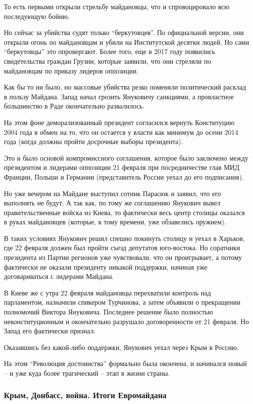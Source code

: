 То есть первыми открыли стрельбу майдановцы, что и спровоцировало всю
последующую бойню.

Но сейчас за убийства судят только \enquote{беркутовцев}. По официальной версии,
они открыли огонь по майдановцам и убили на Институтской десятки людей. Но
сами \enquote{беркутовцы} это опровергают. Более того, еще в 2017 году появились
свидетельства граждан Грузии, которые заявили, что они стреляли по
майдановцам по приказу лидеров оппозиции. 

Как бы то ни было, но массовые убийства резко поменяли политический
расклад в пользу Майдана. Запад начал грозить Януковичу санкциями, а
провластное большинство в Раде окончательно развалилось.

На этом фоне деморализованный президент согласился вернуть Конституцию
2004 года в обмен на то, что он остается у власти как минимум до осени
2014 года (когда должны пройти досрочные выборы президента).

Это и было основой компромиссного соглашения, которое было заключено между
президентом и лидерами оппозиции 21 февраля при посредничестве глав МИД
Франции, Польши и Германии (представитель России уехал до его подписания).

Но уже вечером на Майдане выступил сотник Парасюк и заявил, что его
выполнять не будут. А так как, по тому же соглашению Янукович вывел
правительственные войска из Киева, то фактически весь центр столицы
оказался в руках майдановцев (которые, к тому времени, уже обзавелись
оружием). 

В таких условиях Янукович решил спешно покинуть столицу и уехал в Харьков,
где 22 февраля должен был пройти съезд депутатов юго-востока. Но соратники
президента из Партии регионов уже чувствовали, что он проигрывает, а
потому фактически не оказали президенту никакой поддержки, начиная уже
договариваться с лидерами Майдана.

В Киеве же с утра 22 февраля майдановцы перехватили контроль над
парламентом, назначили спикером Турчинова, а затем объявили о прекращении
полномочий Виктора Януковича. Последнее решение было полностью
неконституционным и окончательно разрушало договоренности от 21 февраля.
Но Запад его фактически признал.

Оказавшись без какой-либо поддержки, Янукович уехал через Крым в Россию. 

На этом \enquote{Революция достоинства} формально была окончена, и начинался новый
– и уже куда более трагический – этап в жизни страны. 

\subsubsection{Крым, Донбасс, война. Итоги Евромайдана}

